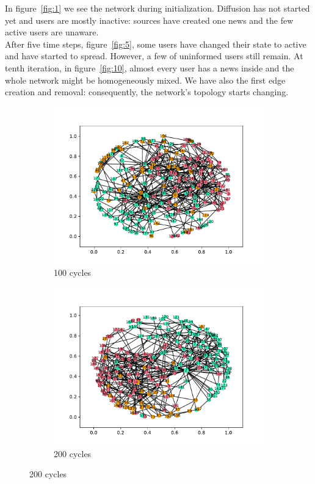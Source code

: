 In figure~\ref{fig:1} we see the network during initialization. Diffusion
has not started yet and users are mostly inactive:
sources have created one news and the few active users are unaware.\\
After five time steps, figure~\ref{fig:5}, some users have changed their state
to active and have started to spread.
However, a few of uninformed users still remain.
At tenth iteration, in figure~\ref{fig:10}, almost every user
has a news inside and the whole network might be homogeneously mixed. 
We have also the first edge creation and removal: 
consequently, the network's topology starts changing.\\
\begin{figure}[htpb]
  \centering
  \begin{subfigure}[t]{.45\textwidth}
    \centering
    \includegraphics[trim={1cm .5cm 1cm 1cm}, clip, width=\linewidth]{img/pdf/plot-0100.pdf} 
    \caption{100 cycles}
    \label{fig:100}
  \end{subfigure}
  \begin{subfigure}[t]{.45\textwidth}
    \centering
    \includegraphics[trim={1cm .5cm 1cm 1cm}, clip, width=\linewidth]{img/pdf/plot-0200.pdf} 
    \caption{200 cycles}
    \label{fig:200}
  \end{subfigure}


\end{figure}
